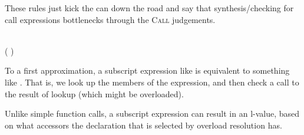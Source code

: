 \begin{Checking}
	\vspace{1em}

\end{Checking}

\begin{Incomplete}
These rules just kick the can down the road and say that synthesis/checking for call expressions bottlenecks through the \textsc{Call} judgements.
\end{Incomplete}

%
%
%
%
%
%
%
%


\begin{Syntax}
	 \\
		 \code{[} ( \code{,})\SynStar \code{]}
\end{Syntax}

\begin{Incomplete}
To a first approximation, a subscript expression like  is equivalent to something like .
That is, we look up the  members of the  expression, and then check a call to the result of lookup (which might be overloaded).

Unlike simple function calls, a subscript expression can result in an l-value, based on what accessors the  declaration that is selected by overload resolution has.
\end{Incomplete}

